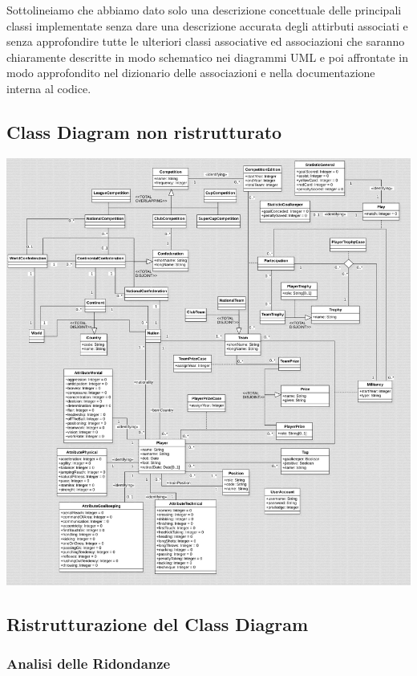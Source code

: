 Sottolineiamo che abbiamo dato solo una descrizione concettuale delle principali classi
implementate senza dare una descrizione accurata degli attirbuti associati e senza approfondire
tutte le ulteriori classi associative ed associazioni che saranno chiaramente descritte
in modo schematico nei diagrammi UML e poi affrontate in modo approfondito nel dizionario
delle associazioni e nella documentazione interna al codice.
\newpage
\subsection{Class Diagram non ristrutturato}

\includegraphics[width=\textwidth]{res/class_diagram_not_ristr}
\newpage

\subsection{Ristrutturazione del Class Diagram}
\subsubsection{Analisi delle Ridondanze}

